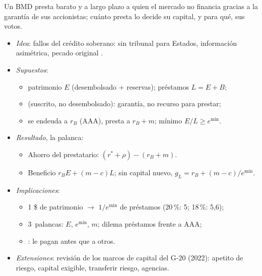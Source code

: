 \documentclass{article}
\begin{document}
\begin{columnas}
\begin{ideaclave}
Un BMD presta barato y a largo plazo a quien el mercado no financia gracias a la garantía de sus accionistas; cuánto presta lo decide su capital, y para qué, sus votos.
\end{ideaclave}
\begin{itemize}
\item \emph{Idea}: fallos del crédito soberano: sin tribunal para Estados, información asimétrica, pecado original .
\item \emph{Supuestos}:
  \begin{itemize}
  \item patrimonio $E$ (desembolsado + reservas); préstamos $L=E+B$;
  \item {} (suscrito, no desembolsado): garantía, no recurso para prestar;
  \item se endeuda a $r_B$ (AAA), presta a $r_B+m$; mínimo $E/L\geq e^{\min}$.
  \end{itemize}
\item \emph{Resultado}, la palanca:
  \begin{itemize}
  \item Ahorro del prestatario: $(r^*+\rho)-(r_B+m)$.
  \item Beneficio $r_BE+(m-c)L$; sin capital nuevo, $g_L=r_B+(m-c)/e^{\min}$.
  \end{itemize}
\item \emph{Implicaciones}:
  \begin{itemize}
  \item 1 \$ de patrimonio $\to$ $1/e^{\min}$ de préstamos (20\,\%: 5; 18\,\%: 5,6);
  \item 3~palancas: $E$, $e^{\min}$, $m$; dilema préstamos frente a AAA;
  \item {}: le pagan antes que a otros.
  \end{itemize}
\end{itemize}
\begin{itemize}
\item \emph{Extensiones}: revisión de los marcos de capital del G-20 (2022): apetito de riesgo, capital exigible, transferir riesgo, agencias.

\end{itemize}
\end{columnas}
\end{document}
